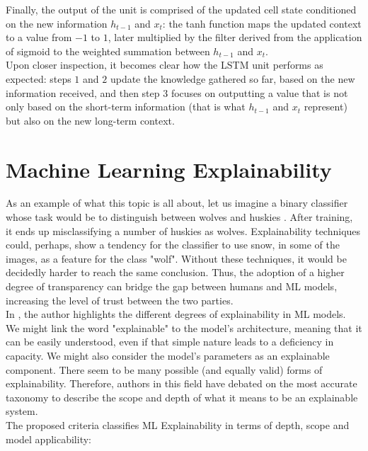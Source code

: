 Finally, the output of the unit is comprised of the updated cell state conditioned on the new information $h_{t-1}$ and $x_{t}$: the tanh function maps the updated context to a value from $-1$ to $1$, later multiplied by the filter derived from the application of sigmoid to the weighted summation between $h_{t-1}$ and $x_{t}$.\\

Upon closer inspection, it becomes clear how the \ac{LSTM} unit performs as expected: steps $1$ and $2$ update the knowledge gathered so far, based on the new information received, and then step $3$ focuses on outputting a value that is not only based on the short-term information (that is what $h_{t-1}$ and $x_{t}$ represent) but also on the new long-term context.

\section{Machine Learning Explainability}
\label{sec:chap2_machine_learning_explainability}

As an example of what this topic is all about, let us imagine a binary classifier whose task would be to distinguish between wolves and huskies \cite{molnar2019}. After training, it ends up misclassifying a number of huskies as wolves. Explainability techniques could, perhaps, show a tendency for the classifier to use snow, in some of the images, as a feature for the class "wolf". Without these techniques, it would be decidedly harder to reach the same conclusion. Thus, the adoption of a higher degree of transparency can bridge the gap between humans and \ac{ML} models, increasing the level of trust between the two parties.\\

In \cite{mythos_of_model_interpretability}, the author highlights the different degrees of explainability in \ac{ML} models. We might link the word "explainable" to the model's architecture, meaning that it can be easily understood, even if that simple nature leads to a deficiency in capacity. We might also consider the model's parameters as an explainable component. There seem to be many possible (and equally valid) forms of explainability. Therefore, authors in this field have debated on the most accurate taxonomy to describe the scope and depth of what it means to be an explainable system.\\

The proposed criteria \cite{molnar2019, mythos_of_model_interpretability} classifies \ac{ML} Explainability in terms of depth, scope and model applicability:

